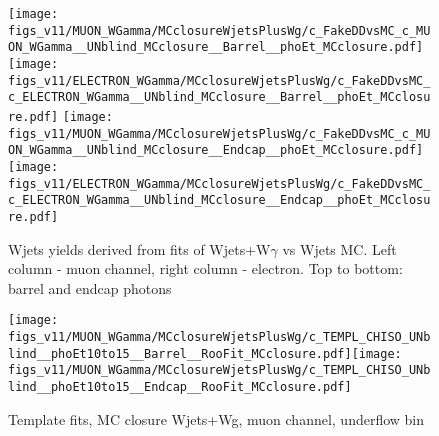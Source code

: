  \begin{figure}[htb]
  \begin{center}
   \texttt{[image: figs\_v11/MUON\_WGamma/MCclosureWjetsPlusWg/c\_FakeDDvsMC\_c\_MUON\_WGamma\_\_UNblind\_MCclosure\_\_Barrel\_\_phoEt\_MCclosure.pdf]}\texttt{[image: figs\_v11/ELECTRON\_WGamma/MCclosureWjetsPlusWg/c\_FakeDDvsMC\_c\_ELECTRON\_WGamma\_\_UNblind\_MCclosure\_\_Barrel\_\_phoEt\_MCclosure.pdf]}
   \texttt{[image: figs\_v11/MUON\_WGamma/MCclosureWjetsPlusWg/c\_FakeDDvsMC\_c\_MUON\_WGamma\_\_UNblind\_MCclosure\_\_Endcap\_\_phoEt\_MCclosure.pdf]}\texttt{[image: figs\_v11/ELECTRON\_WGamma/MCclosureWjetsPlusWg/c\_FakeDDvsMC\_c\_ELECTRON\_WGamma\_\_UNblind\_MCclosure\_\_Endcap\_\_phoEt\_MCclosure.pdf]}
  \caption{Wjets yields derived from fits of Wjets+W$\gamma$ vs Wjets MC. Left column - muon channel, right column - electron. Top to bottom: barrel and endcap photons}
  \label{fig:FakeDDvsMC_MCclosureWjetsPlusWg}
  \end{center}
\end{figure}

\begin{figure}[htb]
  \begin{center}
   \texttt{[image: figs\_v11/MUON\_WGamma/MCclosureWjetsPlusWg/c\_TEMPL\_CHISO\_UNblind\_\_phoEt10to15\_\_Barrel\_\_RooFit\_MCclosure.pdf]}\texttt{[image: figs\_v11/MUON\_WGamma/MCclosureWjetsPlusWg/c\_TEMPL\_CHISO\_UNblind\_\_phoEt10to15\_\_Endcap\_\_RooFit\_MCclosure.pdf]}\\
  \label{fig:templateFits_MCclosureWjetsPlusWg_CHISO_MUON_0}
  \caption{Template fits, MC closure Wjets+Wg, muon channel, underflow bin}
  \end{center}
\end{figure}

